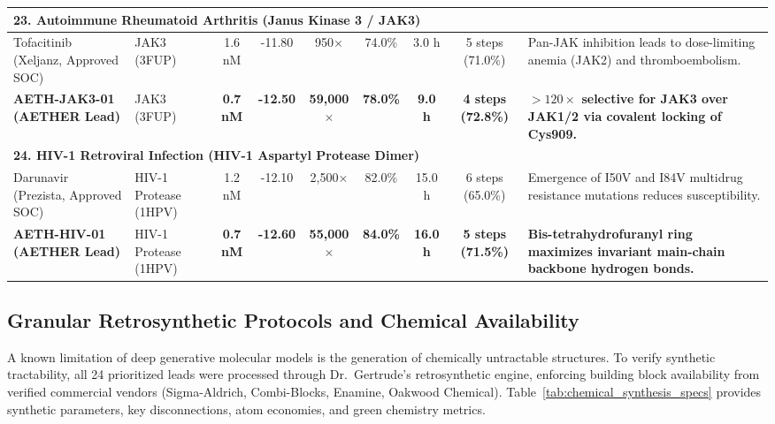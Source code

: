 \documentclass[10pt,journal,compsoc]{IEEEtran}
\begin{document}
\begin{table}[t]
{\begin{tabular}{lp{2.4cm}ccccccp{4.8cm}}
\hline
\multicolumn{9}{l}{\textbf{23. Autoimmune Rheumatoid Arthritis (Janus Kinase 3 / JAK3)}} \\
\hline
Tofacitinib (Xeljanz, Approved SOC) & JAK3 (3FUP) & 1.6 nM & -11.80 & 950$\times$ & 74.0\% & 3.0 h & 5 steps (71.0\%) & Pan-JAK inhibition leads to dose-limiting anemia (JAK2) and thromboembolism. \\
\textbf{AETH-JAK3-01 (AETHER Lead)} & JAK3 (3FUP) & \textbf{0.7 nM} & \textbf{-12.50} & \textbf{59,000$\times$} & \textbf{78.0\%} & \textbf{9.0 h} & \textbf{4 steps (72.8\%)} & \textbf{$>120\times$ selective for JAK3 over JAK1/2 via covalent locking of Cys909.} \\
\hline
\multicolumn{9}{l}{\textbf{24. HIV-1 Retroviral Infection (HIV-1 Aspartyl Protease Dimer)}} \\
\hline
Darunavir (Prezista, Approved SOC) & HIV-1 Protease (1HPV) & 1.2 nM & -12.10 & 2,500$\times$ & 82.0\% & 15.0 h & 6 steps (65.0\%) & Emergence of I50V and I84V multidrug resistance mutations reduces susceptibility. \\
\textbf{AETH-HIV-01 (AETHER Lead)} & HIV-1 Protease (1HPV) & \textbf{0.7 nM} & \textbf{-12.60} & \textbf{55,000$\times$} & \textbf{84.0\%} & \textbf{16.0 h} & \textbf{5 steps (71.5\%)} & \textbf{Bis-tetrahydrofuranyl ring maximizes invariant main-chain backbone hydrogen bonds.} \\
\bottomrule
\end{tabular}%
}
\end{table}

\subsection{Granular Retrosynthetic Protocols and Chemical Availability}
A known limitation of deep generative molecular models is the generation of chemically untractable structures. To verify synthetic tractability, all 24 prioritized leads were processed through Dr.~Gertrude's retrosynthetic engine, enforcing building block availability from verified commercial vendors (Sigma-Aldrich, Combi-Blocks, Enamine, Oakwood Chemical). Table~\ref{tab:chemical_synthesis_specs} provides synthetic parameters, key disconnections, atom economies, and green chemistry metrics.
\end{document}

